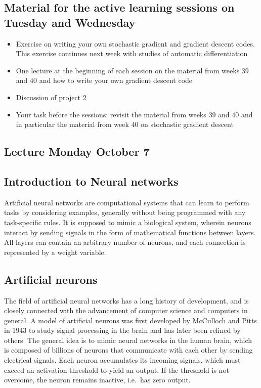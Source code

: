 \documentclass[%
oneside,                 %
final,                   %
10pt]{article}
\begin{document}
\subsection{Material for the active learning sessions on Tuesday and Wednesday}
\begin{itemize}
\item Exercise on writing your own stochastic gradient and gradient descent codes. This exercise continues next week with studies of automatic differentiation

\item One lecture at the beginning of each session on the material from weeks 39 and 40 and how to write your own gradient descent code

\item Discussion of project 2

\item Your task before the sessions: revisit the material from weeks 39 and 40 and in particular the material from week 40 on stochastic gradient descent
\end{itemize}

\noindent
\subsection{Lecture Monday  October 7}

\subsection{Introduction to Neural networks}

Artificial neural networks are computational systems that can learn to
perform tasks by considering examples, generally without being
programmed with any task-specific rules. It is supposed to mimic a
biological system, wherein neurons interact by sending signals in the
form of mathematical functions between layers. All layers can contain
an arbitrary number of neurons, and each connection is represented by
a weight variable.

\subsection{Artificial neurons}

The field of artificial neural networks has a long history of
development, and is closely connected with the advancement of computer
science and computers in general. A model of artificial neurons was
first developed by McCulloch and Pitts in 1943 to study signal
processing in the brain and has later been refined by others. The
general idea is to mimic neural networks in the human brain, which is
composed of billions of neurons that communicate with each other by
sending electrical signals.  Each neuron accumulates its incoming
signals, which must exceed an activation threshold to yield an
output. If the threshold is not overcome, the neuron remains inactive,
i.e.~has zero output.
\end{document}
